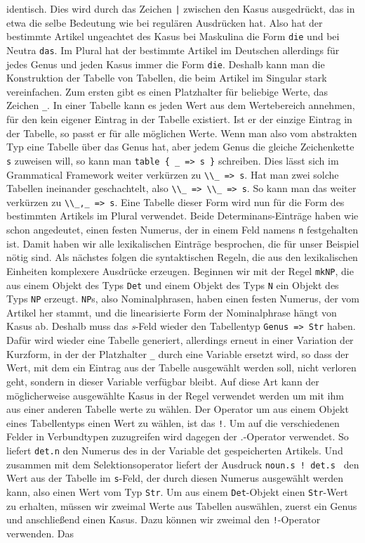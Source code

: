 identisch. Dies wird durch das Zeichen \texttt{|} zwischen den Kasus ausgedrückt, das in etwa die selbe Bedeutung wie bei regulären Ausdrücken hat. Also hat der bestimmte Artikel ungeachtet des Kasus bei Maskulina die Form \texttt{die} und bei Neutra \texttt{das}. Im Plural hat der bestimmte Artikel im Deutschen allerdings für jedes Genus und jeden Kasus immer die Form \texttt{die}. Deshalb kann man die Konstruktion der Tabelle von Tabellen, die beim Artikel im Singular stark vereinfachen. Zum ersten gibt es einen Platzhalter für beliebige Werte, das Zeichen \texttt{\_}. In einer Tabelle kann es jeden Wert aus dem Wertebereich annehmen, für den kein eigener Eintrag in der Tabelle existiert. Ist er der einzige Eintrag in der Tabelle, so passt er für alle möglichen Werte. Wenn man also vom abstrakten Typ eine Tabelle über das Genus hat, aber jedem Genus die gleiche Zeichenkette \texttt{s} zuweisen will, so kann man \texttt{table \{ \_ => s \}} schreiben. Dies lässt sich im Grammatical Framework weiter verkürzen zu \texttt{\textbackslash{}\textbackslash{}\_ => s}. Hat man zwei solche Tabellen ineinander geschachtelt, also \texttt{\textbackslash{}\textbackslash{}\_ => \textbackslash{}\textbackslash{}\_ => s}. So kann man das weiter verkürzen zu \texttt{\textbackslash{}\textbackslash{}\_,\_ => s}. Eine Tabelle dieser Form wird nun für die Form des bestimmten Artikels im Plural verwendet. Beide Determinans-Einträge haben wie schon angedeutet, einen festen Numerus, der in einem Feld namens \texttt{n} festgehalten ist. Damit haben wir alle lexikalischen Einträge besprochen, die für unser Beispiel nötig sind. Als nächstes folgen die syntaktischen Regeln, die aus den lexikalischen Einheiten komplexere Ausdrücke erzeugen. Beginnen wir mit der Regel \texttt{mkNP}, die aus einem Objekt des Typs \texttt{Det} und einem Objekt des Typs \texttt{N} ein Objekt des Typs \texttt{NP} erzeugt. \texttt{NP}s, also Nominalphrasen, haben einen festen Numerus, der vom Artikel her stammt, und die linearisierte Form der Nominalphrase hängt von Kasus ab. Deshalb muss das \textit{s}-Feld wieder den Tabellentyp \texttt{Genus => Str} haben. Dafür wird wieder eine Tabelle generiert, allerdings erneut in einer Variation der Kurzform, in der der Platzhalter \texttt{\_} durch eine Variable ersetzt wird, so dass der Wert, mit dem ein Eintrag aus der Tabelle ausgewählt werden soll, nicht verloren geht, sondern in dieser Variable verfügbar bleibt. Auf diese Art kann der möglicherweise ausgewählte Kasus in der Regel verwendet werden um mit ihm aus einer anderen Tabelle werte zu wählen. Der Operator um aus einem Objekt eines Tabellentyps einen Wert zu wählen, ist das \texttt{!}. Um auf die verschiedenen Felder in Verbundtypen zuzugreifen wird dagegen der \textit{.}-Operator verwendet. So liefert \texttt{det.n} den Numerus des in der Variable det gespeicherten Artikels. Und zusammen mit dem Selektionsoperator liefert der Ausdruck \texttt{noun.s ! det.s } den Wert aus der Tabelle im \texttt{s}-Feld, der durch diesen Numerus ausgewählt werden kann, also einen Wert vom Typ \texttt{Str}. Um aus einem \texttt{Det}-Objekt einen \texttt{Str}-Wert zu erhalten, müssen wir zweimal Werte aus Tabellen auswählen, zuerst ein Genus und anschließend einen Kasus. Dazu können wir zweimal den \texttt{!}-Operator verwenden. Das 